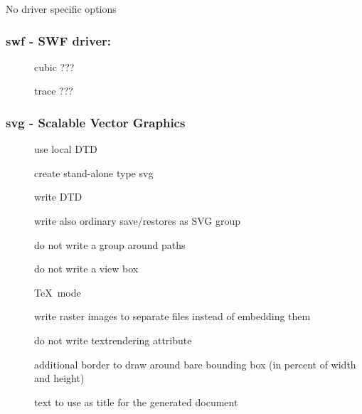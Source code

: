 \documentclass[english,a4paper]{article}
\begin{document}
No driver specific options
\subsubsection{swf - SWF driver: }
\begin{description}
\item[]
cubic ???


\item[]
trace ???


\end{description}
\subsubsection{svg - Scalable Vector Graphics}
\begin{description}
\item[]
use local DTD


\item[]
create stand-alone type svg


\item[]
write DTD


\item[]
write also ordinary save/restores as SVG group


\item[]
do not write a group around paths


\item[]
do not write a view box


\item[]
\TeX\, mode


\item[]
write raster images to separate files instead of embedding them


\item[]
do not write textrendering attribute


\item[]
additional border to draw around bare bounding box (in percent of width and height)


\item[]
text to use as title for the generated document


\end{description}
\end{document}
